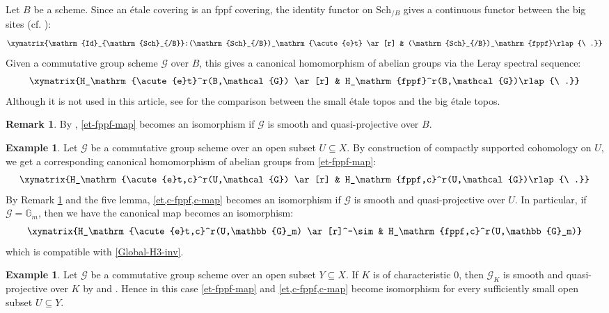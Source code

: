 \documentclass[a4paper]{amsart}
\theoremstyle{definition}
\newtheorem{rmk}[thm]{Remark}
\newtheorem{ex}[thm]{Example}
\numberwithin{equation}{section}
\begin{document}
Let $B$ be a scheme. Since an \'etale covering is an fppf covering, the identity functor on $\mathrm{Sch}_{/B}$ gives a continuous functor between the big sites (cf. \cite[\href{https://stacks.math.columbia.edu/tag/0DDK}{Tag 0DDK}]{Stacks}):
\begin{align*}
    \xymatrix{\mathrm{Id}_{\mathrm{Sch}_{/B}}:(\mathrm{Sch}_{/B})_\mathrm{\acute{e}t} \ar[r] & (\mathrm{Sch}_{/B})_\mathrm{fppf}\rlap{\ .}}
\end{align*}
Given a commutative group scheme $\mathcal{G}$ over $B$, this gives a canonical homomorphism of abelian groups via the Leray spectral sequence:
\begin{align}\label{et-fppf-map}
    \xymatrix{H_\mathrm{\acute{e}t}^r(B,\mathcal{G}) \ar[r] & H_\mathrm{fppf}^r(B,\mathcal{G})\rlap{\ .}}
\end{align}
Although it is not used in this article, see \cite[\href{https://stacks.math.columbia.edu/tag/0757}{Tag 0757}]{Stacks} for the comparison between the small \'etale topos and the big \'etale topos.

\begin{rmk}\label{et-fppf-smqp} By \cite[Theorem III.3.9]{Mil80}, \eqref{et-fppf-map} becomes an isomorphism if $\mathcal{G}$ is smooth and quasi-projective over $B$.
\end{rmk}

\begin{ex} Let $\mathcal{G}$ be a commutative group scheme over an open subset $U\subseteq X$. By construction of compactly supported cohomology on $U$, we get a corresponding canonical homomorphism of abelian groups from \eqref{et-fppf-map}:
\begin{align}\label{et,c-fppf,c-map}
    \xymatrix{H_\mathrm{\acute{e}t,c}^r(U,\mathcal{G}) \ar[r] & H_\mathrm{fppf,c}^r(U,\mathcal{G})\rlap{\ .}}
\end{align}
By Remark \ref{et-fppf-smqp} and the five lemma, \eqref{et,c-fppf,c-map} becomes an isomorphism if $\mathcal{G}$ is smooth and quasi-projective over $U$. In particular, if $\mathcal{G}=\mathbb{G}_m$, then we have the canonical map becomes an isomorphism:
\begin{align*}
    \xymatrix{H_\mathrm{\acute{e}t,c}^r(U,\mathbb{G}_m) \ar[r]^-\sim & H_\mathrm{fppf,c}^r(U,\mathbb{G}_m)}
\end{align*}
which is compatible with \eqref{Global-H3-inv}.
\end{ex}

\begin{ex}\label{et-fppf-small} Let $\mathcal{G}$ be a commutative group scheme over an open subset $Y\subseteq X$. If $K$ is of characteristic $0$, then $\mathcal{G}_K$ is smooth and quasi-projective over $K$ by \cite[\href{https://stacks.math.columbia.edu/tag/047N}{Tag 047N}]{Stacks} and \cite[\href{https://stacks.math.columbia.edu/tag/0BF7}{Tag 0BF7}]{Stacks}. Hence in this case \eqref{et-fppf-map} and \eqref{et,c-fppf,c-map} become isomorphism for every sufficiently small open subset $U\subseteq Y$.
\end{ex}
\end{document}
